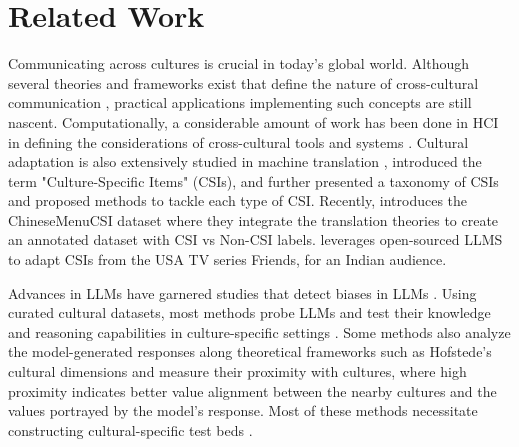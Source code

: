 \section{Related Work}
Communicating across cultures is crucial in today's global world. Although several theories and frameworks exist that define the nature of cross-cultural communication \cite{gudykunst2003cross, tannen1983cross, hurn2013cross, gardner1962cross}, practical applications implementing such concepts are still nascent. Computationally, a considerable amount of work has been done in HCI in defining the considerations of cross-cultural tools and systems \cite{bourges1998meaning, kyriakoullis2016culture, heimgartner2018culturally}. Cultural adaptation is also extensively studied in machine translation \cite{bassnett2007culture, trivedi2007translating, sperber1994cross}, \citet{aixela1996culture} introduced the term "Culture-Specific Items" (CSIs), and \citet{newmark2003textbook} further presented a taxonomy of CSIs and proposed methods to tackle each type of CSI. Recently, \citet{zhang-etal-2024-cultural} introduces the ChineseMenuCSI dataset where they integrate the translation theories to create an annotated dataset with CSI vs Non-CSI labels. \citet{singh-etal-2024-translating} leverages open-sourced LLMS to adapt CSIs from the USA TV series Friends, for an Indian audience. 

Advances in LLMs have garnered studies that detect biases in LLMs \cite{tao2023auditing, kharchenko2024llmsrepresentvaluescultures,duan2023ranking, lin-etal-2025-investigating}. Using curated cultural datasets, most methods probe LLMs and test their knowledge and reasoning capabilities in culture-specific settings  \cite{nadeem-etal-2021-stereoset,nangia-etal-2020-crows, wan-etal-2023-personalized, jha-etal-2023-seegull, li2024culturegenrevealingglobalcultural, cao-etal-2023-assessing, tanmay2023probingmoraldevelopmentlarge, rao-etal-2023-ethical, kovač2023largelanguagemodelssuperpositions}. Some methods \cite{kharchenko2024llmsrepresentvaluescultures, li2024culturellm, dawson2024evaluatingculturalawarenessllms} also analyze the model-generated responses along theoretical frameworks such as Hofstede's cultural dimensions \cite{book1, book2} and measure their proximity with cultures, where high proximity indicates better value alignment between the nearby cultures and the values portrayed by the model's response. Most of these methods necessitate constructing cultural-specific test beds \cite{wang-etal-2024-cdeval, rao2024normadbenchmarkmeasuringcultural, NEURIPS2024_8eb88844, zhou2024doesmapotofucontain, putri-etal-2024-llm, mostafazadeh-davani-etal-2024-d3code,  wibowo-etal-2024-copal, owen2024komodolinguisticexpeditionindonesias, chiu2024culturalbenchrobustdiversechallenging, liu-etal-2024-multilingual, koto-etal-2024-indoculture}.